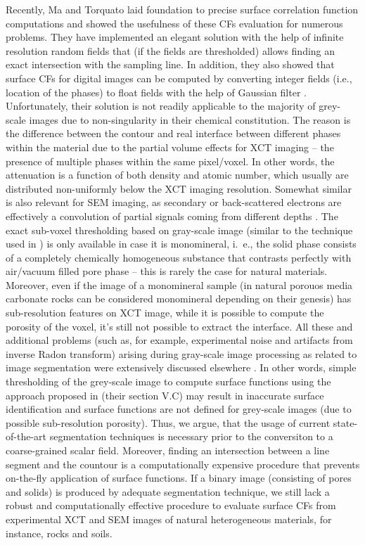 \documentclass[reprint,amsmath,amssymb,aps,pre,showkeys,showpacs]{revtex4-1}
\begin{document}
Recently, Ma and Torquato \cite{ma2018SS} laid foundation to precise surface
correlation function computations and showed the usefulness of these CFs
evaluation for numerous problems. They have implemented an elegant solution with
the help of infinite resolution random fields that (if the fields are
thresholded) allows finding an exact intersection with the sampling line. In
addition, they also showed that surface CFs for digital images can be computed
by converting integer fields (i.e., location of the phases) to float fields with
the help of Gaussian filter \cite{ma2018SS}. Unfortunately, their solution is
not readily applicable to the majority of grey-scale images due to
non-singularity in their chemical constitution. The reason is the difference
between the contour and real interface between different phases within the
material due to the partial volume effects \cite{Wildenschild_Sheppard} for XCT
imaging -- the presence of multiple phases within the same pixel/voxel. In other
words, the attenuation is a function of both density and atomic number, which
usually are distributed non-uniformly below the XCT imaging resolution. Somewhat
similar is also relevant for SEM imaging, as secondary or back-scattered
electrons are effectively a convolution of partial signals coming from different
depths \cite{Bultreys_review}. The exact sub-voxel thresholding based on
gray-scale image (similar to the technique used in \cite{ma2018SS}) is only
available in case it is monomineral, i.~e., the solid phase consists of a
completely chemically homogeneous substance that contrasts perfectly with
air/vacuum filled pore phase -- this is rarely the case for natural
materials. Moreover, even if the image of a monomineral sample (in natural
porouos media carbonate rocks can be considered monomineral depending on their
genesis) has sub-resolution features on XCT image, while it is possible to
compute the porosity of the voxel, it's still not possible to extract the
interface. All these and additional problems (such as, for example, experimental
noise and artifacts from inverse Radon transform) arising during gray-scale
image processing as related to image segmentation were extensively discussed
elsewhere \cite{NNseg}. In other words, simple thresholding of the grey-scale
image to compute surface functions using the approach proposed in
\cite{ma2018SS} (their section V.C) may result in inaccurate surface
identification and surface functions are not defined for grey-scale images (due
to possible sub-resolution porosity). Thus, we argue, that the usage of current
state-of-the-art segmentation techniques is necessary prior to the conversiton
to a coarse-grained scalar field. Moreover, finding an intersection between a
line segment and the countour is a computationally expensive procedure that
prevents on-the-fly application of surface functions. If a binary image
(consisting of pores and solids) is produced by adequate segmentation technique,
we still lack a robust and computationally effective procedure to evaluate
surface CFs from experimental XCT and SEM images of natural heterogeneous
materials, for instance, rocks and soils.
\end{document}
